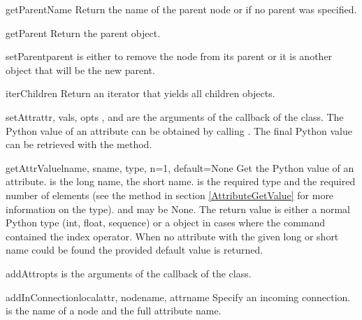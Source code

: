 \begin{methoddesc}{getParentName}{}
Return the name of the parent node or  if no parent was specified.
\end{methoddesc}

\begin{methoddesc}{getParent}{}
Return the parent  object.
\end{methoddesc}

\begin{methoddesc}{setParent}{parent}
 is either  to remove the node from its parent
or it is another  object that will be the new parent.
\end{methoddesc}

\begin{methoddesc}{iterChildren}{}
Return an iterator that yields all children  objects.
\end{methoddesc}

\begin{methoddesc}{setAttr}{attr, vals, opts}
,  and  are the arguments of the 
 callback of the  class. The Python
value of an attribute can be obtained by calling .
The final Python value can be retrieved with the 
 method.
\end{methoddesc}

\begin{methoddesc}{getAttrValue}{lname, sname, type, n=1, default=None}
Get the Python value of an attribute.
 is the long name,  the short name. 
is the required type and  the required number of elements 
(see the  method in section \ref{AttributeGetValue} for more information on the type). 
 and  may be None.
The return value is either a normal Python type (int, float, sequence)
or a  object in cases where the 
command contained the index operator. When no attribute with the given long
or short name could be found the provided default value is returned.
\end{methoddesc}

\begin{methoddesc}{addAttr}{opts}
 is the arguments of the  callback of 
the  class.
\end{methoddesc}

\begin{methoddesc}{addInConnection}{localattr, nodename, attrname}
Specify an incoming connection.
 is the name of a node and  the full 
attribute name.
\end{methoddesc}

